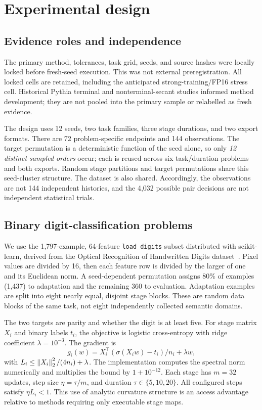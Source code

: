 \section{Experimental design}
\subsection{Evidence roles and independence}
The primary method, tolerances, task grid, seeds, and source hashes were locally locked before fresh-seed execution. This was not external preregistration. All locked cells are retained, including the anticipated strong-training/FP16 stress cell. Historical Pythia terminal and nonterminal-secant studies informed method development; they are not pooled into the primary sample or relabelled as fresh evidence.

The design uses 12 seeds, two task families, three stage durations, and two export formats. There are 72 problem-specific endpoints and 144 observations. The target permutation is a deterministic function of the seed alone, so only \emph{12 distinct sampled orders} occur; each is reused across six task/duration problems and both exports. Random stage partitions and target permutations share this seed-cluster structure. The dataset is also shared. Accordingly, the observations are not 144 independent histories, and the 4,032 possible pair decisions are not independent statistical trials.

\subsection{Binary digit-classification problems}
We use the 1,797-example, 64-feature \texttt{load\_digits} subset distributed with scikit-learn, derived from the Optical Recognition of Handwritten Digits dataset~\cite{digits1998,sklearndigits}. Pixel values are divided by 16, then each feature row is divided by the larger of one and its Euclidean norm. A seed-dependent permutation assigns 80\% of examples (1,437) to adaptation and the remaining 360 to evaluation. Adaptation examples are split into eight nearly equal, disjoint stage blocks. These are random data blocks of the same task, not eight independently collected semantic domains.

The two targets are parity and whether the digit is at least five. For stage matrix $X_i$ and binary labels $t_i$, the objective is logistic cross-entropy with ridge coefficient $\lambda=10^{-3}$. The gradient is
\begin{equation}
 g_i(w)=X_i^\top(\sigma(X_iw)-t_i)/n_i+\lambda w,
\end{equation}
with $L_i\leq\left\lVert X_i\right\rVert_2^2/(4n_i)+\lambda$. The implementation computes the spectral norm numerically and multiplies the bound by $1+10^{-12}$. Each stage has $m=32$ updates, step size $\eta=\tau/m$, and duration $\tau\in\{5,10,20\}$. All configured steps satisfy $\eta L_i<1$. This use of analytic curvature structure is an access advantage relative to methods requiring only executable stage maps.


